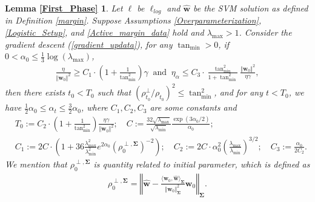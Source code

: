 \documentclass[pdflatex,sn-basic]{sn-jnl}%
\theoremstyle{thmstyleone}%
\begin{document}
\begin{appendices}
\newtheorem*{restate_First_Phase}{Lemma \ref{First_Phase}}
\begin{shaded}
\begin{restate_First_Phase}
  Let $\ell$ be $\ell_{log}$ and $\hat{\mathbf{w}}$ be the SVM solution as defined in Definition \ref{margin}. 
  Suppose Assumptions \ref{Overparameterization}, \ref{Logistic_Setup}, and \ref{Active_margin_data} hold and $\lambda_{\max} > 1$.
  Consider the gradient descent (\ref{gradient_updata}), 
  for any $\tan_{\min} > 0$, if
  $0 < \alpha_0 \le \frac{1}{3} \log \left(\lambda_{\max}\right)$, 
  \begin{equation*}
  \begin{aligned}
    \frac{\eta}{\Vert \mathbf{w}_0 \Vert^2} \ge 
    C_1 \cdot \left(1 + \frac{1}{\tan_{\min}^2}\right) \gamma
    \ \text{ and } \ 
    \eta_{\alpha} \le C_3 \cdot \frac{\tan_{\min}^2}{1 + \tan_{\min}^2}
    \frac{\Vert \mathbf{w}_0 \Vert^2}{\eta \gamma},
  \end{aligned}
  \end{equation*}
  then there exists $t_0 < T_0$ such that 
  $\left(\rho_{t_0}^{\perp} / \rho_{t_0}\right)^2 \le \tan_{\min}^2$, 
  and for any $t < T_0$, 
  we have $\frac{1}{2}\alpha_0 \le \alpha_t \le \frac{3}{2}\alpha_0$, 
  where $C_1, C_2, C_3$ are some constants and 
  \begin{equation*}
  \begin{aligned}
    & 
    T_0 := C_2 \cdot \left(1 + \frac{1}{\tan_{\min}^2}\right) \frac{\eta \gamma}{\Vert \mathbf{w}_0 \Vert^2};
    \quad C := 
    \frac{32 \sqrt{\lambda_{\max}}}{\sqrt{\lambda_{\min}}}
    \frac{ \exp \left({3 \alpha_0 /2 }\right)}{\alpha_0};
    \\ & C_1 := 
    2 C \cdot
      \left(
      1 + 36 
      \frac{ \lambda_{\max}^2}{\lambda_{\min}^2}
      e^{2\alpha_0}
      \left(
        \rho_0^{\perp, \mathbf{\Sigma}}
      \right)^{-2}
    \right);
    \quad
    C_2 := 
    2 C \cdot
    \alpha_{0}^2 \left( \frac{\lambda_{\max}}{\lambda_{\min}} \right)^{3/2};
    \quad
    C_3 := \frac{\alpha_0}{2 C_2}.
  \end{aligned}
  \end{equation*}
  We mention that $\rho_0^{\perp, \mathbf{\Sigma}}$ is quantity related to initial parameter, which is defined as 
  \begin{equation*}
  \begin{aligned}
    \rho_0^{\perp, \mathbf{\Sigma}} = \left\Vert
      \hat{\mathbf{w}} - \frac{\langle \mathbf{w}_0, \hat{\mathbf{w}}\rangle_{\mathbf{\Sigma}} }
      {\Vert \mathbf{w}_0 \Vert_{\mathbf{\Sigma}}^2 } \mathbf{w}_{0}
    \right\Vert_{\mathbf{\Sigma}}.
  \end{aligned}
  \end{equation*}
\end{restate_First_Phase}
\end{shaded}


\end{appendices}
\end{document}
